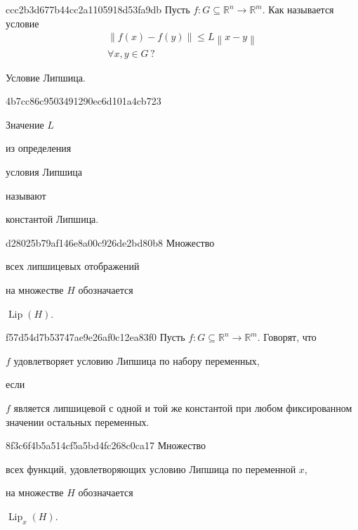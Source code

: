 \begin{note}{ccc2b3d677b44cc2a1105918d53fa9db}
    Пусть \({ f : G \subseteq \mathbb R^{n} \to \mathbb R^{m} }\).
    Как называется условие
    \begin{gather*}
        \left\lVert f(x) - f(y) \right\rVert \leqslant L\left\lVert x - y \right\rVert \\
        \forall x, y \in G\,?
    \end{gather*}

    \begin{cloze}{1}
        Условие Липшица.
    \end{cloze}
\end{note}

\begin{note}{4b7cc86c9503491290ec6d101a4cb723}
    \begin{icloze}{2}Значение \({ L }\)\end{icloze} из определения \begin{icloze}{2}условия Липшица\end{icloze} называют \begin{icloze}{1}константой Липшица.\end{icloze}
\end{note}

\begin{note}{d28025b79af146e8a00c926de2bd80b8}
    Множество \begin{icloze}{2}всех липшицевых отображений\end{icloze} на множестве \({ H }\) обозначается \begin{icloze}{1}\({ \operatorname{Lip}(H) }\).\end{icloze}
\end{note}

\begin{note}{f57d54d7b53747ae9e26af0c12ea83f0}
    Пусть \({ f : G \subseteq \mathbb R^{n} \to \mathbb R^{m} }\).
    Говорят, что \begin{icloze}{2}\({ f }\) удовлетворяет условию Липшица по набору переменных,\end{icloze} если
    \begin{icloze}{1}
        \({ f }\) является липшицевой с одной и той же константой при любом фиксированном значении остальных переменных.
    \end{icloze}
\end{note}

\begin{note}{8f3c6f4b5a514cf5a5bd4fc268c0ca17}
    Множество \begin{icloze}{2}всех функций, удовлетворяющих условию Липшица по переменной \({ x }\),\end{icloze} на множестве \({ H }\) обозначается \begin{icloze}{1}\({ \operatorname{Lip}_x (H) }\).\end{icloze}
\end{note}

